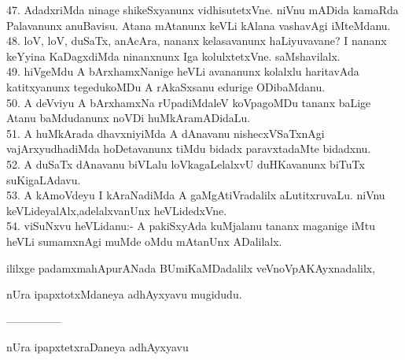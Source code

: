 \documentclass{article}
\begin{document}
47. AdadxriMda ninage shikeSxyanunx vidhisutetxVne. niVnu mADida kamaRda Palavanunx anuBavisu. Atana mAtanunx keVLi kAlana vashavAgi iMteMdanu.\\
48. loV, loV, duSaTx, anAcAra, nananx kelasavanunx haLiyuvavane? I nananx keYyina KaDagxdiMda ninanxnunx Iga kolulxtetxVne. saMshavilalx.\\
49. hiVgeMdu A bArxhamxNanige heVLi avananunx kolalxlu haritavAda katitxyanunx tegedukoMDu A rAkaSxsanu edurige ODibaMdanu.\\
50. A deVviyu A bArxhamxNa rUpadiMdaleV koVpagoMDu tananx baLige Atanu baMdudanunx noVDi huMkAramADidaLu.\\
51. A huMkArada dhavxniyiMda A dAnavanu nishecxVSaTxnAgi vajArxyudhadiMda hoDetavanunx tiMdu bidadx paravxtadaMte bidadxnu.\\
52. A duSaTx dAnavanu biVLalu loVkagaLelalxvU duHKavanunx biTuTx suKigaLAdavu.\\
53. A kAmoVdeyu I kAraNadiMda A gaMgAtiVradalilx aLutitxruvaLu. niVnu keVLideyalAlx,adelalxvanUnx heVLidedxVne.\\
54. viSuNxvu heVLidanu:- A pakiSxyAda kuMjalanu tananx maganige iMtu heVLi sumamxnAgi muMde oMdu mAtanUnx ADalilalx.

\begin{center}
ililxge padamxmahApurANada BUmiKaMDadalilx veVnoVpAKAyxnadalilx,
\end{center}

\begin{center}
nUra ipapxtotxMdaneya adhAyxyavu mugidudu.
\end{center}

\begin{center}
---------------
\end{center}

\begin{center}
nUra ipapxtetxraDaneya adhAyxyavu
\end{center}
\end{document}
